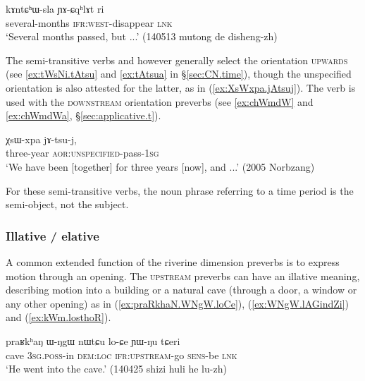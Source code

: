 \begin{exe}
\ex \label{ex:kAntChWsla.YACqhlAt}
\gll kɤntɕʰɯ-sla ɲɤ-ɕqʰlɤt ri \\
several-months \textsc{ifr}:\textsc{west}-disappear \textsc{lnk} \\
\glt `Several months passed, but ...' (140513 mutong de disheng-zh) 
\end{exe}

The semi-transitive verbs  and  however generally select the orientation \textsc{upwards} (see \ref{ex:tWsNi.tAtsu} and \ref{ex:tAtsua} in §\ref{sec:CN.time}),  though the unspecified orientation is also attested for the latter, as in (\ref{ex:XsWxpa.jAtsuj}).   The verb  is used with the \textsc{downstream} orientation preverbs (see \ref{ex:chWmdW} and \ref{ex:chWmdWa}, §\ref{sec:applicative.t}).

\begin{exe}
\ex \label{ex:XsWxpa.jAtsuj}
\gll χsɯ-xpa jɤ-tsu-j, \\
three-year \textsc{aor}:\textsc{unspecified}-pass-\textsc{1sg} \\
\glt `We have been [together] for three years [now], and ...' (2005 Norbzang)
\end{exe}
 
For these semi-transitive verbs, the noun phrase referring to a time period is the semi-object, not the subject.

\subsubsection{Illative / elative} \label{sec:illative.elative}
A common extended function of the riverine dimension preverbs is to express motion through an opening. The \textsc{upstream} preverbs can have an illative meaning, describing motion into a building or a natural cave (through a door, a window or any other opening) as in (\ref{ex:praRkhaN.WNgW.loCe}), (\ref{ex:WNgW.lAGindZi}) and (\ref{ex:kWm.losthoR}).

\begin{exe}
\ex \label{ex:praRkhaN.WNgW.loCe}
\gll  praʁkʰaŋ ɯ-ŋgɯ nɯtɕu lo-ɕe ɲɯ-ŋu tɕeri \\
cave \textsc{3sg}.\textsc{poss}-in \textsc{dem}:\textsc{loc} \textsc{ifr}:\textsc{upstream}-go \textsc{sens}-be \textsc{lnk} \\
\glt `He went into the cave.' (140425 shizi huli he lu-zh)
\end{exe}

